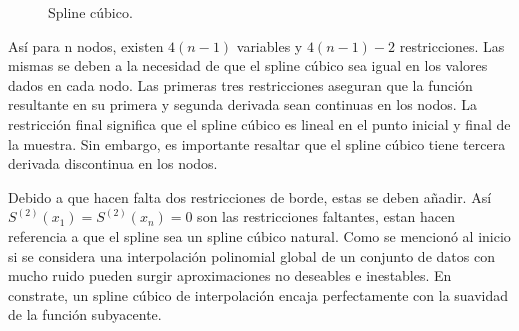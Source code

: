 \begin{figure}[h]
\caption{Spline c\'ubico.}
\label{spline_3}
\end{figure}



\hspace{0.4cm}As\'i para n nodos, existen $4(n-1)$ variables y $4(n-1)-2$ restricciones. Las mismas se deben a la necesidad de que el spline c\'ubico sea igual en los valores dados en cada nodo. Las primeras tres restricciones aseguran que la funci\'on resultante en su primera y segunda derivada sean continuas en los nodos. La restricci\'on final significa que el spline c\'ubico es lineal en el punto inicial y final de la muestra. Sin embargo, es importante resaltar que el spline c\'ubico tiene tercera derivada discontinua en los nodos.

\hspace{0.4cm}Debido a que hacen falta dos restricciones de borde, estas se deben a\~nadir. As\'i  $S^{(2)}(x_{1}) = S^{(2)}(x_{n}) = 0$ son las restricciones faltantes, estan hacen referencia a que el spline sea un spline c\'ubico natural. Como se mencion\'o al inicio si se considera una interpolaci\'on polinomial global de un conjunto de datos con mucho ruido pueden surgir aproximaciones no deseables e inestables. En constrate, un spline c\'ubico de interpolaci\'on encaja perfectamente con la suavidad de la funci\'on subyacente.


